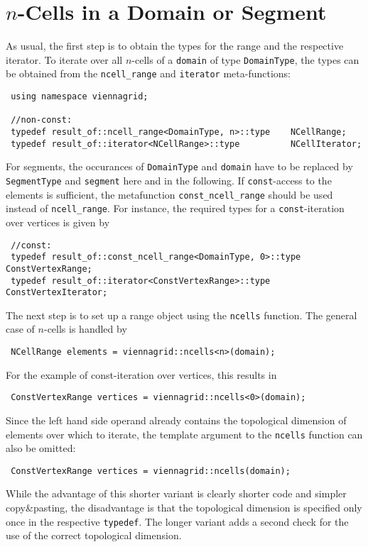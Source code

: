 \section{$n$-Cells in a Domain or Segment}
As usual, the first step is to obtain the types for the range and the respective iterator.
To iterate over all $n$-cells of a \lstinline|domain| of type \lstinline|DomainType|, the types can be obtained from the \lstinline|ncell_range| and \lstinline|iterator| meta-functions:
\begin{lstlisting}
 using namespace viennagrid;

 //non-const:
 typedef result_of::ncell_range<DomainType, n>::type    NCellRange;
 typedef result_of::iterator<NCellRange>::type          NCellIterator;
\end{lstlisting}
For segments, the occurances of \lstinline|DomainType| and \lstinline|domain| have to be replaced by \lstinline|SegmentType| and \lstinline|segment| here and in the following.
If \lstinline|const|-access to the elements is sufficient, the metafunction \lstinline|const_ncell_range| should be used instead of \lstinline|ncell_range|.
For instance, the required types for a \lstinline|const|-iteration over vertices is given by
\begin{lstlisting}
 //const:
 typedef result_of::const_ncell_range<DomainType, 0>::type   ConstVertexRange;
 typedef result_of::iterator<ConstVertexRange>::type         ConstVertexIterator;
\end{lstlisting}

The next step is to set up a range object using the \lstinline|ncells| function.
The general case of $n$-cells is handled by
\begin{lstlisting}
 NCellRange elements = viennagrid::ncells<n>(domain);
\end{lstlisting}
For the example of const-iteration over vertices, this results in
\begin{lstlisting}
 ConstVertexRange vertices = viennagrid::ncells<0>(domain);
\end{lstlisting}
Since the left hand side operand already contains the topological dimension of elements over which to iterate, 
the template argument to the \lstinline|ncells| function can also be omitted:
\begin{lstlisting}
 ConstVertexRange vertices = viennagrid::ncells(domain);
\end{lstlisting}
While the advantage of this shorter variant is clearly shorter code and simpler copy\&pasting, the disadvantage is that the topological dimension is specified only once in the respective \lstinline|typedef|. The longer variant adds a second check for the use of the correct topological dimension.


